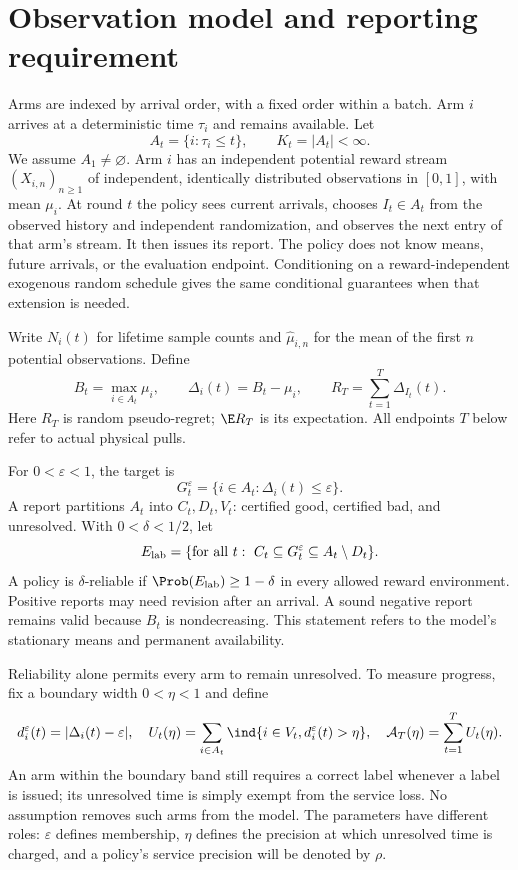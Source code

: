 \section{Observation model and reporting requirement}
\label{sec:model}

Arms are indexed by arrival order, with a fixed order within a batch. Arm $i$
arrives at a deterministic time $\tau_i$ and remains available. Let
\[
 A_t=\{i:\tau_i\le t\},\qquad K_t=|A_t|<\infty.
\]
We assume $A_1\ne\varnothing$. Arm $i$ has an independent potential reward
stream $(X_{i,n})_{n\ge1}$ of independent, identically distributed observations
in $[0,1]$, with mean $\mu_i$. At round $t$ the policy sees current arrivals,
chooses $I_t\in A_t$ from the observed history and independent randomization,
and observes the next entry of that arm's stream. It then issues its report.
The policy does not know means, future arrivals, or the evaluation endpoint.
Conditioning on a reward-independent exogenous random schedule gives the same
conditional guarantees when that extension is needed.

Write $N_i(t)$ for lifetime sample counts and $\widehat\mu_{i,n}$ for the mean
of the first $n$ potential observations. Define
\[
 B_t=\max_{i\in A_t}\mu_i,\qquad
 \Delta_i(t)=B_t-\mu_i,\qquad
 R_T=\sum_{t=1}^T\Delta_{I_t}(t).
\]
Here $R_T$ is random pseudo-regret; $\E R_T$ is its expectation.
All endpoints $T$ below refer to actual physical pulls.

For $0<\varepsilon<1$, the target is
\[
 G_t^\varepsilon=\{i\in A_t:\Delta_i(t)\le\varepsilon\}.
\]
A report partitions $A_t$ into $C_t,D_t,V_t$: certified good, certified bad,
and unresolved. With $0<\delta<1/2$, let
\[
 E_{\rm lab}=\{\text{for all }t:\ C_t\subseteq G_t^\varepsilon
                                  \subseteq A_t\setminus D_t\}.
\]
A policy is $\delta$-reliable if $\Prob(E_{\rm lab})\ge1-\delta$ in every
allowed reward environment. Positive reports may need revision after an
arrival. A sound negative report remains valid because $B_t$ is nondecreasing.
This statement refers to the model's stationary means and permanent availability.

Reliability alone permits every arm to remain unresolved. To measure progress,
fix a boundary width $0<\eta<1$ and define
\begin{equation}
 d_i^\varepsilon(t)=|\Delta_i(t)-\varepsilon|,\quad
 U_t(\eta)=\sum_{i\in A_t}\ind\{i\in V_t,d_i^\varepsilon(t)>\eta\},\quad
 \mathcal A_T(\eta)=\sum_{t=1}^TU_t(\eta).
 \label{eq:area}
\end{equation}
An arm within the boundary band still requires a correct label whenever a
label is issued; its unresolved time is simply exempt from the service loss.
No assumption removes such arms from the model. The parameters have different
roles: $\varepsilon$ defines membership, $\eta$ defines the precision at which
unresolved time is charged, and a policy's service precision will be denoted
by $\rho$.

